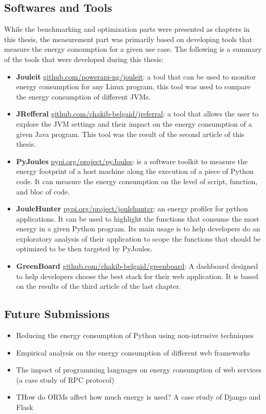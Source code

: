 \begin{enumerate}
\end{enumerate}

\subsection{Softwares and Tools}
While the benchmarking and optimization parts were presented as chapters in this thesis, the measurement part was primarily based on developing tools that measure the energy consumption for a given use case. The following is a summary of the tools that were developed during this thesis:
\begin{itemize}
      \item \textbf{Jouleit} \url{github.com/powerapi-ng/jouleit}: a tool that can be used to monitor energy consumption for any Linux program, this tool was used to compare the energy consumption of different JVMs.
      \item \textbf{JRefferal} \url{github.com/chakib-belgaid/jreferral}: a tool that allows the user to explore the JVM settings and their impact on the energy consumption of a given Java program. This tool was the result of the second article of this thesis.
      \item \textbf{PyJoules} \url{pypi.org/project/pyJoules}: is a software toolkit to measure the energy footprint of a host machine along the execution of a piece of Python code. It can measure the energy consumption on the level of script, function, and bloc of code.
      \item \textbf{JouleHunter} \url{pypi.org/project/joulehunter}: an energy profiler for python applications. It can be used to highlight the functions that consume the most energy in a given Python program. Its main usage is to help developers do an exploratory analysis of their application to scope the functions that should be optimized to be then targeted by PyJoules.
      \item \textbf{GreenBoard} \url{github.com/chakib-belgaid/greenboard}: A dashboard designed to help developers choose the best stack for their web application. It is based on the results of the third article of the last chapter.

\end{itemize}



\subsection{Future Submissions}
\begin{itemize}
      \item Reducing the energy consumption of Python using non-intrusive techniques
      \item Empirical analysis on the energy consumption of different web frameworks
      \item The impact of programming languages on energy consumption of web services (a case study of RPC protocol)
      \item THow do ORMs affect how much energy is used? A case study of Django and Flask
\end{itemize}


